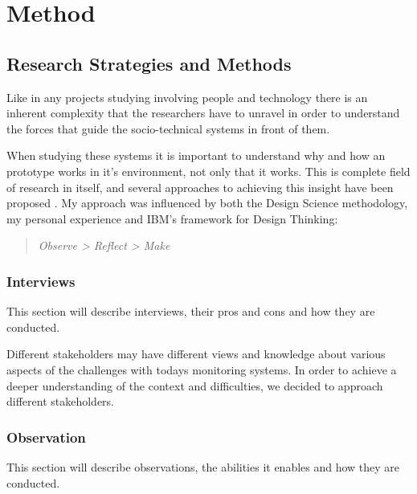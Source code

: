 \section{Method} %
\label{sec:method}


\subsection{Research Strategies and Methods} %
\label{sub:research_strategies_and_methods}


Like in any projects studying involving people and technology there is an inherent complexity that the researchers have to unravel in order to understand the forces that guide the socio-technical systems in front of them.

When studying these systems it is important to understand why and how an prototype works in it's environment, not only that it works. This is complete field of research in itself, and several approaches to achieving this insight have been proposed \cite{Design_thinking_and_others_3}. My approach was influenced by both the Design Science methodology, my personal experience and IBM's framework for Design Thinking: 

\begin{quote} 
\textit{Observe > Reflect > Make}
\end{quote}

\subsubsection{Interviews} %
\label{ssub:interviews}

This section will describe interviews, their pros and cons and how they are conducted.

Different stakeholders may have different views and knowledge about various aspects of the challenges with todays monitoring systems. In order to achieve a deeper understanding of the context and difficulties, we decided to approach different stakeholders.


\subsubsection{Observation} %
\label{ssub:observation}

This section will describe observations, the abilities it enables and how they are conducted.

